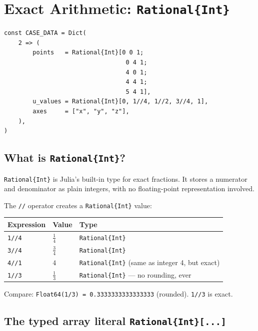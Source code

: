 \documentclass[12pt, a4paper]{article}
\newcommand{\cd}[1]{\texttt{#1}}
\begin{document}
\section{Exact Arithmetic: \texttt{Rational\{Int\}}}

\begin{verbatim}
const CASE_DATA = Dict(
    2 => (
        points   = Rational{Int}[0 0 1;
                                  0 4 1;
                                  4 0 1;
                                  4 4 1;
                                  5 4 1],
        u_values = Rational{Int}[0, 1//4, 1//2, 3//4, 1],
        axes     = ["x", "y", "z"],
    ),
)
\end{verbatim}

\subsection{What is \texttt{Rational\{Int\}}?}

\cd{Rational\{Int\}} is Julia's built-in type for exact fractions.
It stores a numerator and denominator as plain integers,
with no floating-point representation involved.

The \cd{//} operator creates a \cd{Rational\{Int\}} value:

\begin{examplebox}
\begin{tabular}{lll}
\toprule
Expression & Value & Type \\
\midrule
\cd{1//4}  & $\frac{1}{4}$   & \cd{Rational\{Int\}} \\
\cd{3//4}  & $\frac{3}{4}$   & \cd{Rational\{Int\}} \\
\cd{4//1}  & $4$             & \cd{Rational\{Int\}} (same as integer 4, but exact) \\
\cd{1//3}  & $\frac{1}{3}$   & \cd{Rational\{Int\}} --- no rounding, ever \\
\bottomrule
\end{tabular}

\medskip
Compare: \cd{Float64(1/3) = 0.3333333333333333} (rounded).
\cd{1//3} is exact.
\end{examplebox}

\subsection{The typed array literal \texttt{Rational\{Int\}[...]}}
\end{document}
